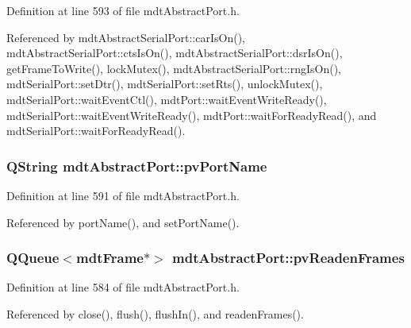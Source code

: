 Definition at line 593 of file mdt\-Abstract\-Port.\-h.



Referenced by mdt\-Abstract\-Serial\-Port\-::car\-Is\-On(), mdt\-Abstract\-Serial\-Port\-::cts\-Is\-On(), mdt\-Abstract\-Serial\-Port\-::dsr\-Is\-On(), get\-Frame\-To\-Write(), lock\-Mutex(), mdt\-Abstract\-Serial\-Port\-::rng\-Is\-On(), mdt\-Serial\-Port\-::set\-Dtr(), mdt\-Serial\-Port\-::set\-Rts(), unlock\-Mutex(), mdt\-Serial\-Port\-::wait\-Event\-Ctl(), mdt\-Port\-::wait\-Event\-Write\-Ready(), mdt\-Serial\-Port\-::wait\-Event\-Write\-Ready(), mdt\-Port\-::wait\-For\-Ready\-Read(), and mdt\-Serial\-Port\-::wait\-For\-Ready\-Read().

\hypertarget{classmdt_abstract_port_afb8f8a723ff2db5141f18750020a7ee9}{
\subsubsection[{pv\-Port\-Name}]{\setlength{\rightskip}{0pt plus 5cm}Q\-String mdt\-Abstract\-Port\-::pv\-Port\-Name\hspace{0.3cm}{\ttfamily [protected]}}}\label{classmdt_abstract_port_afb8f8a723ff2db5141f18750020a7ee9}


Definition at line 591 of file mdt\-Abstract\-Port.\-h.



Referenced by port\-Name(), and set\-Port\-Name().

\hypertarget{classmdt_abstract_port_a412c3e4903bf7d90914cfeb273e82623}{
\subsubsection[{pv\-Readen\-Frames}]{\setlength{\rightskip}{0pt plus 5cm}Q\-Queue$<${\bf mdt\-Frame}$\ast$$>$ mdt\-Abstract\-Port\-::pv\-Readen\-Frames\hspace{0.3cm}{\ttfamily [protected]}}}\label{classmdt_abstract_port_a412c3e4903bf7d90914cfeb273e82623}


Definition at line 584 of file mdt\-Abstract\-Port.\-h.



Referenced by close(), flush(), flush\-In(), and readen\-Frames().

